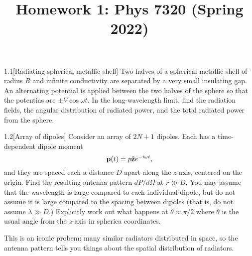 \documentclass[12pt]{article}
\title{Homework 1: Phys 7320 (Spring 2022)}
\begin{document}
\maketitle
\begin{problem}{1.1}[Radiating spherical metallic shell]
Two halves of a spherical metallic shell of radius $R$ and infinite conductivity
are separated by a very small insulating gap. An alternating potential is
applied between the two halves of the sphere so that the potentias are $\pm
V\cos\omega t$. In the long-wavelength limit, find the radiation fields, the
angular distribution of radiated power, and the total radiated power from the
sphere.
\begin{solution}
\end{solution}
\end{problem}
\begin{problem}{1.2}[Array of dipoles]
Consider an array of $2N+1$ dipoles. Each has a time-dependent dipole moment
\begin{equation}
    \vb{p}(t)=p\vb{\hat{z}} e^{-i\omega t}, 
\end{equation}
and they are spaced each a distance $D$ apart along the $z$-axis, centered on
the origin. Find the resulting antenna pattern $dP/d\Omega$ at $r\gg D$. You may
assume that the wavelength is large compared to each individual dipole, but do
not assume it is large compared to the spacing between dipoles (that is, do not
assume $\lambda\gg D$.) Explicitly work out what happens at $\theta\approx\pi/2$
where $\theta$ is the usual angle from the $z$-axis in spherica coordinates.

This is an iconic probem: many similar radiators distributed in space, so the
antenna pattern tells you things about the spatial distribution of radiators.
\begin{solution}
\end{solution}
\end{problem}
\end{document}
